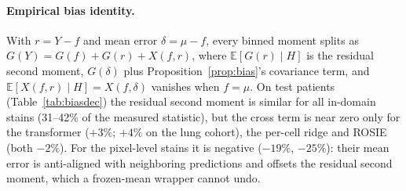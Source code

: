 \documentclass[10pt,letterpaper]{article}
\theoremstyle{definition}
\theoremstyle{remark}
\newcommand{\E}{\mathbb{E}}
\begin{document}
\paragraph{Empirical bias identity.} With $r=Y-f$ and mean error $\delta=\mu-f$, every binned moment splits as $G(Y)=G(f)+G(r)+X(f,r)$, where $\E[G(r)\mid H]$ is the residual second moment, $G(\delta)$ plus Proposition~\ref{prop:bias}'s covariance term, and $\E[X(f,r)\mid H]=X(f,\delta)$ vanishes when $f=\mu$. On test patients (Table~\ref{tab:biasdec}) the residual second moment is similar for all in-domain stains (31--42\% of the measured statistic), but the cross term is near zero only for the transformer ($+3\%$; $+4\%$ on the lung cohort), the per-cell ridge and ROSIE (both $-2\%$). For the pixel-level stains it is negative ($-19\%$, $-25\%$): their mean error is anti-aligned with neighboring predictions and offsets the residual second moment, which a frozen-mean wrapper cannot undo.

\begin{table}[htp]
\centering
\caption{Patient-disjoint calibration on ORION (5 rotations, 40 test patients). Stain and generator are retrained on 20 patients per rotation; 2 patients serve model selection and variance fitting and 10 serve calibration only. Per-statistic split-conformal 90\% intervals (rank 10 of 10); width and interval score are normalized per statistic and averaged; calibration does not change point predictions (clustering MSE 0.66 of the matched plug-in's). Coverage is marginal per statistic, not simultaneous or patient-conditional; ORION was examined during development, so this is not a confirmatory cohort. An earlier exact version with only 4 calibration patients (wrapping ROSIE, whose maps use training patients only) was uninformative even at an 80\% target.}
\label{tab:indcal}
\normalsize

\end{table}
\end{document}
